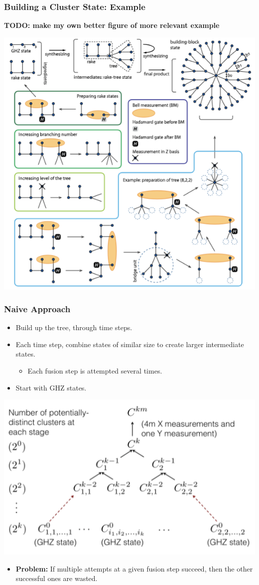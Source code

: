 \documentclass[aspectratio=169,xcolor=dvipsnames]{beamer}
\begin{document}
\begin{frame}
    \frametitle{Building a Cluster State: Example}
    \textbf{\textbf{TODO:} make my own better figure of more relevant example}
    \begin{center}
        \includegraphics[width=0.5\linewidth]{figs/example_creation_stock.png}
    \end{center}
    \end{frame}

\begin{frame}
\frametitle{Naive Approach}
\begin{itemize}
    \item Build up the tree, through time steps.
    \item Each time step, combine states of similar size to create larger intermediate states.
    \begin{itemize}
        \item Each fusion step is attempted several times.
    \end{itemize}
    \item Start with GHZ states.
\end{itemize}
\begin{center}
    \includegraphics[width=0.5\linewidth]{figs/construction-overview.png}
\end{center}
\begin{itemize}
    \item \textbf{Problem:} If multiple attempts at a given fusion step succeed, then the other successful ones are wasted.
\end{itemize}
\end{frame}
\end{document}
